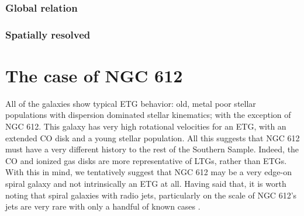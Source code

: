 		\subsubsection{Global relation}

		\subsubsection{Spatially resolved}

\section{The case of NGC 612}
	\label{sec:NGC612}
	All of the galaxies show typical ETG behavior: old, metal poor stellar populations with dispersion dominated stellar kinematics; with the exception of NGC 612. This galaxy has very high rotational velocities for an ETG, with an extended CO disk and a young stellar population. All this suggests that NGC 612 must have a very different history to the rest of the Southern Sample. Indeed, the CO and ionized gas disks are more representative of LTGs, rather than ETGs. With this in mind, we tentatively suggest that NGC 612 may be a very edge-on spiral galaxy and not intrinsically an ETG at all. Having said that, it is worth noting that spiral galaxies with radio jets, particularly on the scale of NGC 612's jets are very rare with only a handful of known cases \citep{}. 